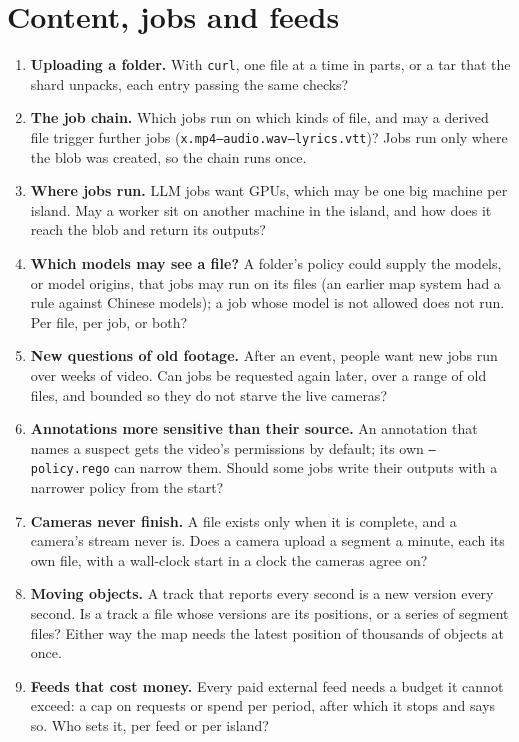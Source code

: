 \section{Content, jobs and feeds}
\begin{enumerate}
\item \textbf{Uploading a folder.} With \texttt{curl}, one file at a time in
  parts, or a tar that the shard unpacks, each entry passing the same checks?
\item \textbf{The job chain.} Which jobs run on which kinds of file, and may a
  derived file trigger further jobs (\texttt{x.mp4--audio.wav--lyrics.vtt})?
  Jobs run only where the blob was created, so the chain runs once.
\item \textbf{Where jobs run.} LLM jobs want GPUs, which may be one big machine
  per island. May a worker sit on another machine in the island, and how does it
  reach the blob and return its outputs?
\item \textbf{Which models may see a file?} A folder's policy could supply the
  models, or model origins, that jobs may run on its files (an earlier map system
  had a rule against Chinese models); a job whose model is not allowed does not run. Per
  file, per job, or both?
\item \textbf{New questions of old footage.} After an event, people want new jobs
  run over weeks of video. Can jobs be requested again later, over a range of old
  files, and bounded so they do not starve the live cameras?
\item \textbf{Annotations more sensitive than their source.} An annotation that
  names a suspect gets the video's permissions by default; its own
  \texttt{--policy.rego} can narrow them. Should some jobs write their outputs
  with a narrower policy from the start?
\item \textbf{Cameras never finish.} A file exists only when it is complete, and a
  camera's stream never is. Does a camera upload a segment a minute, each its own
  file, with a wall-clock start in a clock the cameras agree on?
\item \textbf{Moving objects.} A track that reports every second is a new version
  every second. Is a track a file whose versions are its positions, or a series of
  segment files? Either way the map needs the latest position of thousands of
  objects at once.
\item \textbf{Feeds that cost money.} Every paid external feed needs a budget it
  cannot exceed: a cap on requests or spend per period, after which it stops and
  says so. Who sets it, per feed or per island?
\end{enumerate}

